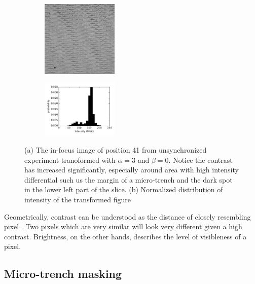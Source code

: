 \documentclass[pdftex,12pt,a4paper]{report}
\begin{document}
\begin{figure}[H]
\centering

\begin{subfigure}{\textwidth}
  \centering
  \includegraphics[width=0.4\textwidth]{images/pos_41_in_t0_br_times3}
  \caption{}
  \label{fig:pos41_times3_bf}
\end{subfigure}%

\begin{subfigure}{\textwidth}
  \centering
  \includegraphics[width=0.4\textwidth]{images/pos_41_in_t0_br_times3_hist}
  \caption{}
  \label{fig:pos41_times3_hist}
\end{subfigure}%

\label{fig:pos41_times3}
\caption{(a) The in-focus image of position 41 from unsynchronized experiment tranoformed with $\alpha=3$ and $\beta = 0$. Notice the contrast has increased significantly, especially around area with high intensity differential such us the margin of a micro-trench and the dark spot in the lower left part of the slice. (b) Normalized distribution of intensity of the transformed figure}
\end{figure}

Geometrically, contrast can be understood as the distance of closely resembling pixel \cite{hartley2003multiple}. Two pixels which are very similar will look very different given a high contrast. Brightness, on the other hands, describes the level of visibleness of a pixel.

\subsection{Micro-trench masking}
\label{subsection:micro_trench_masking}
\end{document}
